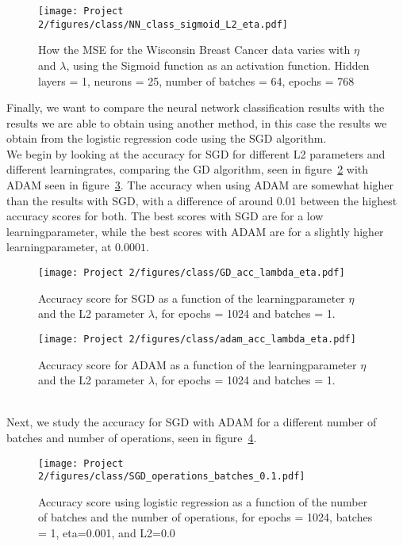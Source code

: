 \documentclass[english,notitlepage,reprint,nofootinbib]{revtex4-2}  %
\begin{document}
\begin{figure}[h!]
    \centering %
    \texttt{[image: Project 2/figures/class/NN\_class\_sigmoid\_L2\_eta.pdf]} 
    \caption{How the MSE for the Wisconsin Breast Cancer data varies with $\eta$ and $\lambda$, using the Sigmoid function as an activation function. Hidden layers = 1, neurons = 25, number of batches = 64, epochs = 768
    }
    \label{fig: nn_L2_eta}
\end{figure}



Finally, we want to compare the neural network classification results with the results we are able to obtain using another method, in this case the results we obtain from the logistic regression code using the SGD algorithm. 
\vspace{3mm}
\\ 
We begin by looking at the accuracy for SGD for different L2 parameters and different learningrates, comparing the GD algorithm, seen in figure~\ref{fig: gd_lambda_eta} with ADAM seen in figure~\ref{fig: adam_lambda_eta}. The accuracy when using ADAM are somewhat higher than the results with SGD, with a difference of around 0.01 between the highest accuracy scores for both. The best scores with SGD are for a low learningparameter, while the best scores with ADAM are for a slightly higher learningparameter, at $0.0001$. 
\begin{figure}[h!]
    \centering %
    \texttt{[image: Project 2/figures/class/GD\_acc\_lambda\_eta.pdf]} 
    \caption{Accuracy score for SGD as a function of the learningparameter $\eta$ and the L2 parameter $\lambda$, for epochs = 1024 and batches = 1.}
    \label{fig: gd_lambda_eta}
\end{figure}
\begin{figure}[h!]
    \centering %
    \texttt{[image: Project 2/figures/class/adam\_acc\_lambda\_eta.pdf]} 
    \caption{Accuracy score for ADAM as a function of the learningparameter $\eta$ and the L2 parameter $\lambda$, for epochs = 1024 and batches = 1.}
    \label{fig: adam_lambda_eta}
\end{figure}
\vspace{3mm}
\\ 
Next, we study the accuracy for SGD with ADAM for a different number of batches and number of operations, seen in figure~\ref{fig: op_batch}. 
\begin{figure}[h!]
    \centering %
    \texttt{[image: Project 2/figures/class/SGD\_operations\_batches\_0.1.pdf]} 
    \caption{Accuracy score using logistic regression as a function of the number of batches and the number of operations, for epochs = 1024, batches = 1, eta=0.001, and L2=0.0}
    \label{fig: op_batch}
\end{figure}
\end{document}
